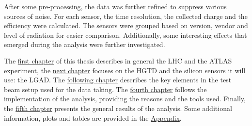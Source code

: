 After some pre-processing, the data was further refined to suppress various sources of noise. For each sensor, the time resolution, the collected charge and the efficiency were calculated. The sensors were grouped based on version, vendor and level of radiation for easier comparison. Additionally, some interesting effects that emerged during the analysis were further investigated.

The \hyperref[chap:LHC_ATLAS]{first chapter} of this thesis describes in general the LHC and the ATLAS experiment, the \hyperref[chap:HGTD_LGADs]{next chapter} focuses on the HGTD and the silicon sensors it will use: the LGAD. The \hyperref[chap:testbeam_setup]{following chapter} describes the key elements in the test beam setup used for the data taking. The \hyperref[chap:analysis]{fourth chapter} follows the implementation of the analysis, providing the reasons and the tools used. Finally, the \hyperref[chap:results]{fifth chapter} presents the general results of the analysis. Some additional information, plots and tables are provided in the \hyperref[chap:appendix]{Appendix}.

